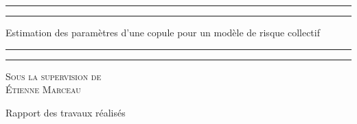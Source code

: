 \documentclass{article}
\begin{document}
	\renewcommand{\figurename}{Illustration}
	\renewcommand{\tablename}{Tableau}
	
		\begin{titlepage}
		\centering %
		
		\scshape %
		
		\vspace*{7\baselineskip} %
		
		
		\rule{\textwidth}{1.6pt}\vspace*{-\baselineskip}\vspace*{2pt} %
		\rule{\textwidth}{0.4pt} %
		
		\vspace{0.75\baselineskip} %
		
		{\LARGE Estimation des paramètres d'une copule pour un modèle de risque collectif \\} %
		\vspace{0.75\baselineskip} %
		
		\rule{\textwidth}{0.4pt}\vspace*{-\baselineskip}\vspace{3.2pt} %
		\rule{\textwidth}{1.6pt} %
		
		\vspace{3\baselineskip} %
		
		{\scshape\Large Sous la supervision de \\Étienne Marceau\\} %
		
		\vspace*{3\baselineskip}
		
		Rapport des travaux réalisés  \\%
		
		\vspace*{3\baselineskip} %
		
		

\end{titlepage}
\end{document}
